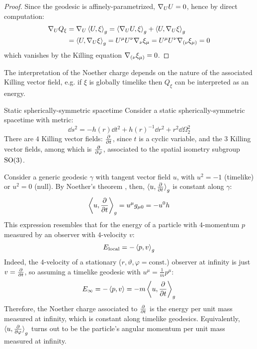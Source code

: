 \begin{proofbox}
  \begin{proof}
    Since the geodesic is affinely-parametrized, $ \nabla_U U = 0 $, hence by direct computation:
    \begin{equation*}
      \begin{split}
        \nabla_U Q_\xi
        & = \nabla_U \braket{U , \xi}_g = \braket{\nabla_U U , \xi}_g + \braket{U , \nabla_U \xi}_g \\
        & = \braket{U , \nabla_U \xi}_g = U^\mu U^\nu \nabla_\nu \xi_\mu = U^\mu U^\nu \nabla_{(\nu} \xi_{\mu)} = 0
      \end{split}
    \end{equation*}
    which vanishes by the Killing equation $ \nabla_{(\nu} \xi_{\mu)} = 0 $.
  \end{proof}
\end{proofbox}

The interpretation of the Noether charge depends on the nature of the associated Killing vector field, e.g. if $ \xi $ is globally timelike then $ Q_\xi $ can be interpreted as an energy.

\begin{example}{Static spherically-symmetric spacetime}{}
  Consider a static spherically-symmetric spacetime with metric:
  \begin{equation*}
    \dd s^2 = - h(r) \dd t^2 + h(r)^{-1} \dd r^2 + r^2 \dd \Omega_2^2
  \end{equation*}
  There are $ 4 $ Killing vector fields: $ \frac{\partial}{\partial t} $, since $ t $ is a cyclic variable, and the $ 3 $ Killing vector fields, among which is $ \frac{\partial}{\partial \varphi} $, associated to the spatial isometry subgroup $ \mathrm{SO}(3) $.

  Consider a generic geodesic $ \gamma $ with tangent vector field $ u $, with $ u^2 = -1 $ (timelike) or $ u^2 = 0 $ (null). By Noether's theorem , then, $ \braket{u , \frac{\partial}{\partial t}}_g $ is constant along $ \gamma $:
  \begin{equation*}
    \left\langle u , \frac{\partial}{\partial t} \right\rangle_g = u^\mu g_{\mu 0} = - u^0 h
  \end{equation*}
  This expression resembles that for the energy of a particle with $ 4 $-momentum $ p $ measured by an observer with $ 4 $-velocity $ v $:
  \begin{equation}
    E_\text{local} = - \braket{p , v}_g
  \end{equation}
  Indeed, the $ 4 $-velocity of a stationary ($ r , \vartheta , \varphi = \text{const.} $) observer at infinity is just $ v = \frac{\partial}{\partial t} $, so assuming a timelike geodesic with $ u^\mu = \frac{1}{m} p^\mu $:
  \begin{equation*}
    E_\infty = - \braket{p , v} = - m \left\langle u , \frac{\partial}{\partial t} \right\rangle_g
  \end{equation*}
  Therefore, the Noether charge associated to $ \frac{\partial}{\partial t} $ is the energy per unit mass measured at infinity, which is constant along timelike geodesics. Equivalently, $ \braket{u , \frac{\partial}{\partial \varphi}}_g $ turns out to be the particle's angular momentum per unit mass measured at infinity.
\end{example}

